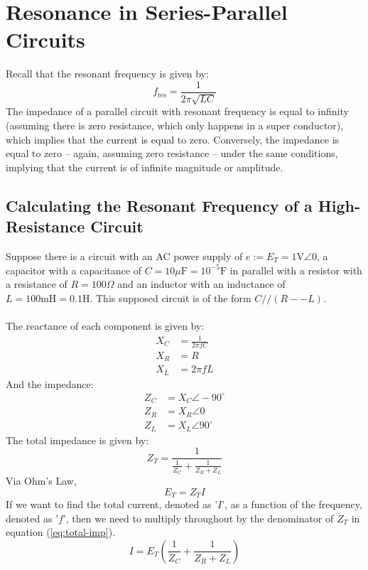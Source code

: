 \documentclass{article}
\begin{document}
	\section[Series-Parallel]{Resonance in Series-Parallel Circuits}
	Recall that the resonant frequency is given by:
	\begin{equation}\label{eq:res-freq}
		f_{\text{res}}=\frac{1}{2\pi \sqrt{LC}}
	\end{equation}
	The impedance of a parallel circuit with resonant frequency is equal to 
	infinity (assuming there is zero resistance, which only happens in a super 
	conductor), which implies that the current is equal to zero.  Conversely, 
	the impedance is equal to zero -- again, assuming zero resistance -- under 
	the same conditions, implying that the current is of infinite magnitude or 
	amplitude.
	\subsection[High-Res]{Calculating the Resonant Frequency of a 
	High-Resistance Circuit}
	Suppose there is a circuit with an AC power supply of 
	$e:=E_T=1\text{V}\angle0$, a capacitor with a capacitance of 
	$C=10\mu\text{F}=10^{-5}\text{F}$ in parallel with a resistor with a 
	resistance of $R=100\Omega$ and an inductor with an inductance of 
	$L=100\text{mH}=0.1\text{H}$.  This supposed circuit is of the form 
	$C//(R--L)$.\\ \\
	The reactance of each component is given by:
	\begin{align*}
		X_C &= \frac{1}{2\pi f C} \\
		X_R &= R \\
		X_L &= 2\pi f L
	\end{align*}
	And the impedance:
	\begin{align*}
		Z_C &= X_C \angle-90^{\circ} \\
		Z_R &= X_R \angle 0 \\
		Z_L &= X_L \angle 90^{\circ}
	\end{align*}
	The total impedance is given by:
	\begin{equation}\label{eq:total-imp}
		Z_T = \frac{1}{\frac{1}{Z_C}+\frac{1}{Z_R+Z_L}}
	\end{equation}
	Via Ohm's Law,
	$$ E_T = Z_TI$$
	If we want to find the total current, denoted as '$I$', as a function of 
	the frequency, denoted as '$f$', then we need to multiply throughout by the 
	denominator of $Z_T$ in equation (\ref{eq:total-imp}).
	$$ I = E_T\left(\frac{1}{Z_C} + \frac{1}{Z_R+Z_L}\right)$$
\end{document}
